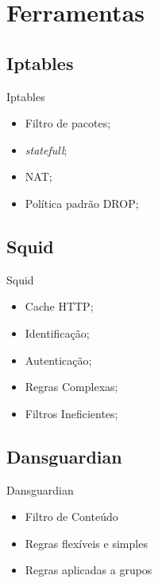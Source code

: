 \renewcommand{\titulo}{Ferramentas}
\section{\titulo}



\renewcommand{\titulo}{Iptables}
\subsection{\titulo}

\begin{frame}{\titulo}
\begin{itemize}
\item Filtro de pacotes;
\item \textit{statefull};
\item NAT;
\item Política padrão DROP;
\end{itemize}
\end{frame}

\renewcommand{\titulo}{Squid}
\subsection{\titulo}
\begin{frame}{\titulo}
\begin{itemize}
\item Cache HTTP;
\item Identificação;
\item Autenticação;
\item Regras Complexas;
\item Filtros Ineficientes;
\end{itemize}
\end{frame}

\renewcommand{\titulo}{Dansguardian}
\subsection{\titulo}
\begin{frame}{\titulo}
\begin{itemize}
\item Filtro de Conteúdo
\item Regras flexíveis e simples
\item Regras aplicadas a grupos
\end{itemize}
\end{frame}

